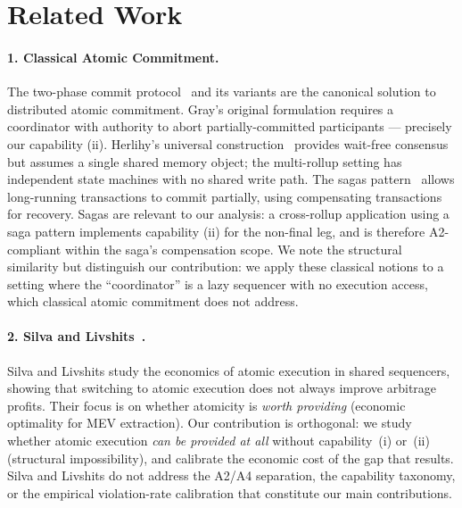 %

\section{Related Work}
\label{sec:related}

\paragraph{1. Classical Atomic Commitment.}
The two-phase commit protocol~\cite{gray1978notes} and its variants are the
canonical solution to distributed atomic commitment. Gray's original formulation
requires a coordinator with authority to abort partially-committed participants
--- precisely our capability (ii). Herlihy's universal construction~\cite{herlihy1991wait}
provides wait-free consensus but assumes a single shared memory object; the
multi-rollup setting has independent state machines with no shared write path.
The sagas pattern~\cite{garcia-molina1987sagas} allows long-running transactions
to commit partially, using compensating transactions for recovery. Sagas are
relevant to our analysis: a cross-rollup application using a saga pattern
implements capability (ii) for the non-final leg, and is therefore A2-compliant
within the saga's compensation scope. We note the structural similarity but
distinguish our contribution: we apply these classical notions to a setting
where the ``coordinator'' is a lazy sequencer with no execution access, which
classical atomic commitment does not address.

\paragraph{2. Silva and Livshits~\cite{arxiv2410.11552}.}
Silva and Livshits study the economics of atomic execution in shared
sequencers, showing that switching to atomic execution does not always
improve arbitrage profits. Their focus is on whether atomicity is
\emph{worth providing} (economic optimality for MEV extraction).
Our contribution is orthogonal: we study whether atomic execution
\emph{can be provided at all} without capability~(i) or~(ii)
(structural impossibility), and calibrate the economic cost of the
gap that results. Silva and Livshits do not address the A2/A4
separation, the capability taxonomy, or the empirical violation-rate
calibration that constitute our main contributions.

